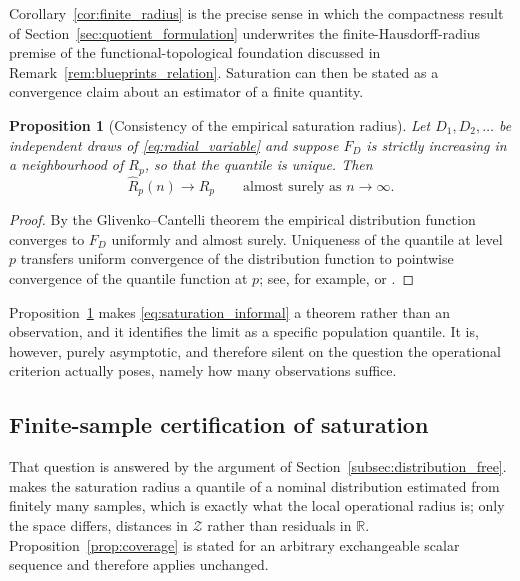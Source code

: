 \documentclass[a4paper]{cas-sc}
\newtheorem{proposition}{Proposition}
\newcommand{\Z}{\ensuremath{\mathcal{Z}}}
\newcommand{\R}{\ensuremath{\mathbb{R}}}
\begin{document}
Corollary~\ref{cor:finite_radius} is the precise sense in which the compactness
result of Section~\ref{sec:quotient_formulation} underwrites the
finite-Hausdorff-radius premise of the functional-topological foundation
discussed in Remark~\ref{rem:blueprints_relation}. Saturation can then be
stated as a convergence claim about an estimator of a finite quantity.

\begin{proposition}[Consistency of the empirical saturation radius]
\label{prop:radius_consistency}
Let \(D_1,D_2,\ldots\) be independent draws of \eqref{eq:radial_variable} and
suppose \(F_D\) is strictly increasing in a neighbourhood of \(R_p\), so that
the quantile is unique. Then
\begin{equation}
\widehat R_p(n) \longrightarrow R_p \qquad \text{almost surely as } n\to\infty .
\label{eq:radius_consistency}
\end{equation}
\end{proposition}

\begin{proof}
By the Glivenko--Cantelli theorem the empirical distribution function
converges to \(F_D\) uniformly and almost surely. Uniqueness of the quantile at
level \(p\) transfers uniform convergence of the distribution function to
pointwise convergence of the quantile function at \(p\); see, for example,
\citet[Sec.~2.3]{serfling1980} or \citet[Lemma~21.2]{vandervaart1998}.
\end{proof}

Proposition~\ref{prop:radius_consistency} makes
\eqref{eq:saturation_informal} a theorem rather than an observation, and it
identifies the limit as a specific population quantile. It is, however, purely
asymptotic, and therefore silent on the question the operational criterion
actually poses, namely how many observations suffice.

\subsection{Finite-sample certification of saturation}
\label{subsec:saturation_certification}

That question is answered by the argument of
Section~\ref{subsec:distribution_free}. %
makes the saturation radius a quantile of a nominal distribution estimated from
finitely many samples, which is exactly what the local operational radius is;
only the space differs, distances in \(\Z\) rather than residuals in \(\R\).
Proposition~\ref{prop:coverage} is stated for an arbitrary exchangeable scalar
sequence and therefore applies unchanged.
\end{document}
